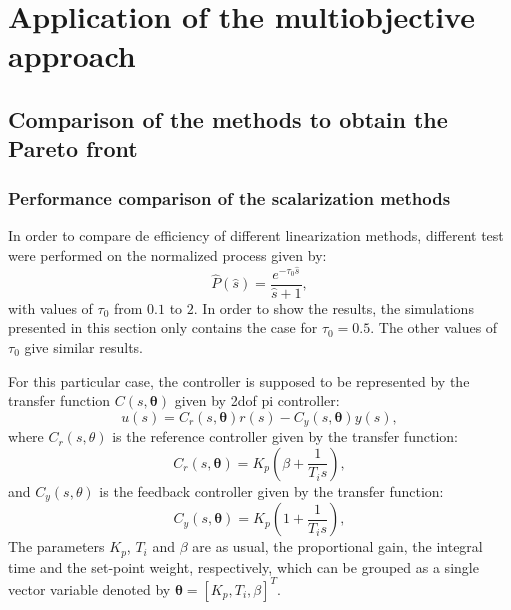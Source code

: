\chapter{Application of the multiobjective approach}
\label{chap:ApplicationExamplesNoGUI}


\section{Comparison of the methods to obtain the Pareto front}
\label{sec:Comparison}
\subsection{Performance comparison of the scalarization methods}
In order to compare de efficiency of different linearization methods, different test were performed on the normalized process given by:
%
\begin{equation}
\hat{P}(\hat{s}) = \frac{e^{-\tau_0 \hat{s}}}{\hat{s}+1},
\label{eq:NormP}
\end{equation}
%
with values of $\tau_0$ from $0.1$ to $2$. In order to show the results, the simulations presented in this section only contains the case for $\tau_0=0.5$. The other values of $\tau_0$ give similar results.

For this particular case, the controller is supposed to be represented by the transfer function $C(s,\bm{\theta})$ given by \gls{2dof} \gls{pi} controller:
\begin{equation}
u(s) = C_r(s,\bm{\theta}) r(s) - C_y(s,\bm{\theta}) y(s),
\label{eq:2PIControl}
\end{equation}
where $C_r(s,\theta)$ is the reference controller given by the transfer function:
\begin{equation}
C_r(s,\bm{\theta})= K_p \left(\beta + \frac{1}{T_i s} \right),
\label{eq:CrControl}
\end{equation}
%
and $C_y(s,\theta)$ is the feedback controller given by the transfer function:
\begin{equation}
C_y(s,\bm{\theta})=K_p \left(1 + \frac{1}{T_i s} \right),
\label{eq:CyControl}
\end{equation}
%
The parameters $K_p$, $T_i$ and $\beta$ are as usual, the proportional gain, the integral time and the set-point weight, respectively, which can be grouped as a single vector variable denoted by $\bm{\theta}=\left[K_p,T_i,\beta\right]^{T}$.

